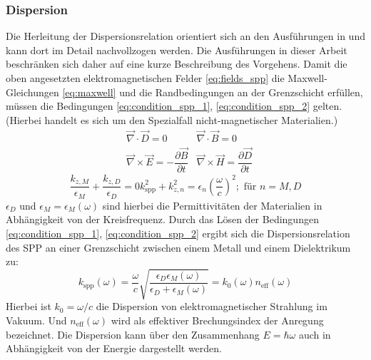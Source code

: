 \documentclass[titlepage]{article}
\begin{document}
	\subsubsection{Dispersion}
	Die Herleitung der Dispersionsrelation orientiert sich an den Ausführungen in \cite[pp.~261--ff]{Fox.2020} und kann dort im Detail nachvollzogen werden. Die Ausführungen in dieser Arbeit beschränken sich daher auf eine kurze Beschreibung des Vorgehens.
	Damit die oben angesetzten elektromagnetischen Felder \eqref{eq:fields_spp}  die Maxwell-Gleichungen \eqref{eq:maxwell} und die Randbedingungen an der Grenzschicht erfüllen, müssen die Bedingungen \eqref{eq:condition_spp_1},  \eqref{eq:condition_spp_2} gelten. (Hierbei handelt es sich um den Spezialfall nicht-magnetischer Materialien.)
	\begin{align}
		\label{eq:maxwell}	
		&\vec{\nabla}\cdot\vec{D} = 0		&\vec{\nabla}\cdot\vec{B} = 0 \\
		&\vec{\nabla}\times\vec{E} = -\dfrac{\partial\vec{B}}{\partial t} 
		&\vec{\nabla}\times\vec{H} = 	\dfrac{\partial\vec{D}}{\partial t}\nonumber
	\end{align}
	\begin{subequations}
		\begin{equation}
			\label{eq:condition_spp_1}
			\dfrac{k_{z, M}}{\epsilon_M} + \dfrac{k_{z, D}}{\epsilon_D} = 0
		\end{equation}		
		\begin{equation}
			\label{eq:condition_spp_2}
			k_{\mathrm{spp}}^2 +k_{z, n}^2 = \epsilon_n\left(\dfrac{\omega}{c}\right)^2; \text{ für  } n=M,D
		\end{equation}
	\end{subequations}
	$\epsilon_D$ und $\epsilon_M = \epsilon_M(\omega) $ sind hierbei die Permittivitäten der Materialien in Abhängigkeit von der Kreisfrequenz.
	Durch das Lösen der Bedingungen \eqref{eq:condition_spp_1},  \eqref{eq:condition_spp_2} ergibt sich die Dispersionsrelation des SPP an einer Grenzschicht zwischen einem Metall und einem Dielektrikum zu: 
	\begin{equation}
		\label{eq:dispersion_spp}
		\boxed{
			k_{\mathrm{spp}}\left(\omega\right) = \dfrac{\omega}{c} \sqrt{\dfrac{\epsilon_D\epsilon_M(\omega)}{\epsilon_D + 	\epsilon_M(\omega)}}  = k_0(\omega) n_{\mathrm{eff}}(\omega)}
	\end{equation}
	Hierbei ist $k_0 = \omega / c$ die Dispersion von elektromagnetischer Strahlung im Vakuum. Und $n_{\mathrm{eff}}(\omega)$ wird als effektiver Brechungsindex der Anregung bezeichnet. Die Dispersion kann über den Zusammenhang $E = \hbar \omega$ auch in Abhängigkeit von der Energie dargestellt werden.
	
\end{document}
